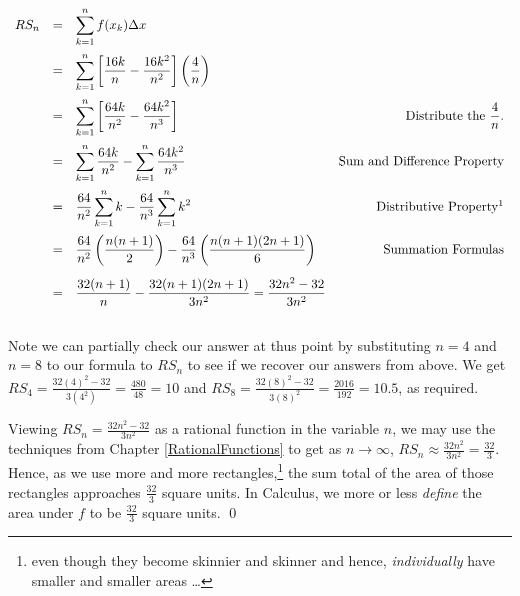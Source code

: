 \begin{ex}
\begin{enumerate}
\[\begin{array}{rclr}
RS_{n} & = & \displaystyle{ \sum_{k=1}^{n} f(x_{k}) \Delta x} & \\ [15pt]
            & = & \displaystyle{ \sum_{k=1}^{n} \left[\dfrac{16k}{n} - \dfrac{16k^2}{n^2} \right] \left( \dfrac{4}{n} \right)} & \\ [15pt]
             & = & \displaystyle{ \sum_{k=1}^{n} \left[\dfrac{64k}{n^2} - \dfrac{64k^2}{n^3} \right]} & \text{Distribute the $ \dfrac{4}{n}$.}  \\ [15pt]
             & = & \displaystyle{ \sum_{k=1}^{n} \dfrac{64k}{n^2}  - \sum_{k=1}^{n} \dfrac{64k^2}{n^3} } & \text{Sum and Difference Property} \\ [15pt]
            & = & \displaystyle{ \dfrac{64}{n^2} \sum_{k=1}^{n} k  - \dfrac{64}{n^3} \sum_{k=1}^{n} k^2 } & \text{Distributive Property\footnotemark} \\ [15pt]
            & = & \displaystyle{ \dfrac{64}{n^2} \left( \dfrac{n(n+1)}{2} \right) - \dfrac{64}{n^3}\left( \dfrac{n(n+1)(2n+1)}{6} \right) } & \text{Summation Formulas} \\ [15pt]
          & = & \displaystyle{\dfrac{32(n+1)}{n}  - \dfrac{32(n+1)(2n+1)}{3n^2} =  \dfrac{32n^2-32}{3n^2}}&  \\ [15pt]
 \end{array}\] 
 
 Note we can partially check our answer at thus point by substituting $n=4$ and $n=8$ to our formula to $RS_{n}$ to see if we recover our answers from above.  We get $RS_{4} = \frac{32(4)^2 - 32}{3(4^2)}= \frac{480}{48} = 10$ and $RS_{8} = \frac{32(8)^2 - 32}{3(8)^2} = \frac{2016}{192} = 10.5$, as required.
 
Viewing  $RS_{n} =  \frac{32n^2-32}{3n^2}$ as a rational function in the variable $n$, we may use the techniques from Chapter \ref{RationalFunctions} to get as $n \rightarrow \infty$, $RS_{n} \approx \frac{32n^2}{3n^2} = \frac{32}{3}$.  Hence, as we use more and more rectangles,\footnote{even though they become skinnier and skinner and hence, \textit{individually} have smaller and smaller areas \ldots} the sum total of the area of those rectangles approaches $\frac{32}{3}$ square units.  In  Calculus, we more or less  \textit{define} the area under $f$ to be $\frac{32}{3}$ square units. \qed

\end{enumerate}

\end{ex}

